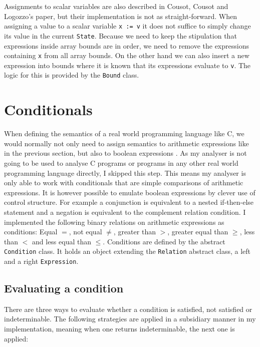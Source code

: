 Assignments to scalar variables are also described in Cousot, Cousot and Logozzo's paper, but their implementation is not as straight-forward. When assigning a value to a scalar variable \texttt{x := v} it does not suffice to simply change its value in the current \texttt{State}. Because we need to keep the stipulation that expressions inside array bounds are in order, we need to remove the expressions containing \texttt{x} from all array bounds. On the other hand we can also insert a new expression into bounds where it is known that its expressions evaluate to \texttt{v}. The logic for this is provided by the \texttt{Bound} class.





\section{Conditionals}\label{sec:conditions}

When defining the semantics of a real world programming language like C, we would normally not only need to assign semantics to arithmetic expressions like in the previous section, but also to boolean expressions \cite{scott1971}. As my analyser is not going to be used to analyse C programs or programs in any other real world programming language directly, I skipped this step. This means my analyser is only able to work with conditionals that are simple comparisons of arithmetic expressions. It is however possible to emulate boolean expressions by clever use of control structure. For example a conjunction is equivalent to a nested if-then-else statement and a negation is equivalent to the complement relation condition. I implemented the following binary relations on arithmetic expressions as conditions: Equal $=$, not equal $\neq$, greater than $>$, greater equal than $\geq$, less than $<$ and less equal than $\leq$. Conditions are defined by the abstract \texttt{Condition} class. It holds an object extending the \texttt{Relation} abstract class, a left and a right \texttt{Expression}.

\subsection{Evaluating a condition}

There are three ways to evaluate whether a condition is satisfied, not satisfied or indeterminable. The following strategies are applied in a subsidiary manner in my implementation, meaning when one returns indeterminable, the next one is applied:

